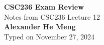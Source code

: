 \begin{titlepage}
    \null %
    \vfill
    \begin{center}
        {\fontsize{40}{48}\selectfont \bfseries CSC236 Exam Review}
        \vspace{20pt} \\
        {\LARGE Notes from CSC236 Lecture 12} \\
        \vspace{20pt}
        \textbf{Alexander He Meng}
        \vspace{8pt}
        \\ Typed on November 27, 2024
    \end{center}
    \vfill
\end{titlepage}
